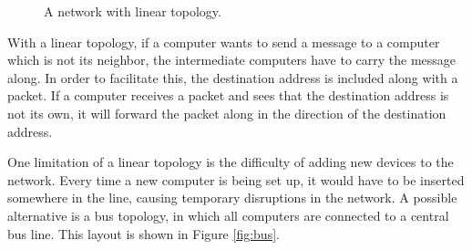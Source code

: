 \begin{figure}
    \centering
    \caption{A network with linear topology.}
    \label{fig:daisy_chain}
\end{figure}

With a linear topology, if a computer wants to send a message to a computer which is not its neighbor, the intermediate computers have to carry the message along. In order to facilitate this, the destination address is included along with a packet. If a computer receives a packet and sees that the destination address is not its own, it will forward the packet along in the direction of the destination address.

One limitation of a linear topology is the difficulty of adding new devices to the network. Every time a new computer is being set up, it would have to be inserted somewhere in the line, causing temporary disruptions in the network. A possible alternative is a bus topology, in which all computers are connected to a central bus line. This layout is shown in Figure \ref{fig:bus}.

